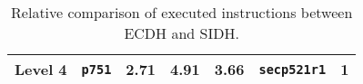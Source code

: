 \begin{table}[H]
\begin{tabular}{|K{1.8cm}|K{1.8cm}|K{1.8cm}|K{2cm}|K{1.8cm}|K{1.8cm}|K{1.8cm}|}
\hline
{}Level 4                                                                                                                                                & {}\texttt{p751}                                                                   & 2.71                 & 4.91                                                                                                        & 3.66           & {}\texttt{secp521r1}                                                              & {}1  \\
\hline
\end{tabular}
\caption[Comparing executed instructions between \gls{ECDH} and \gls{SIDH}]{Relative comparison of executed instructions between \gls{ECDH} and \gls{SIDH}.}
\label{tab:conclusion_ecdh_sidh}
\end{table}

